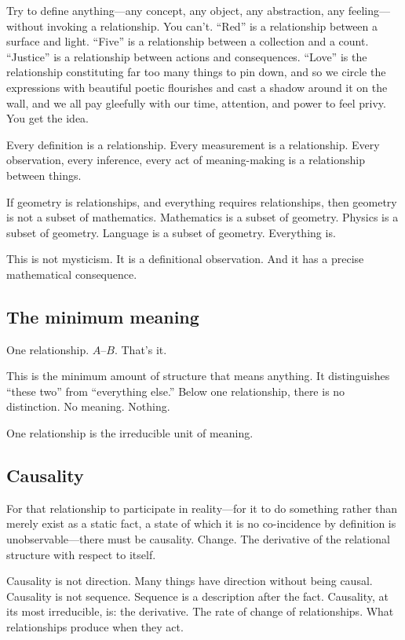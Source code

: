 \documentclass[11pt,a4paper]{article}
\theoremstyle{definition}
\theoremstyle{remark}
\begin{document}
Try to define anything---any concept, any object, any abstraction, any feeling---without invoking a relationship. You can't. ``Red'' is a relationship between a surface and light. ``Five'' is a relationship between a collection and a count. ``Justice'' is a relationship between actions and consequences. ``Love'' is the relationship constituting far too many things to pin down, and so we circle the expressions with beautiful poetic flourishes and cast a shadow around it on the wall, and we all pay gleefully with our time, attention, and power to feel privy. You get the idea.

Every definition is a relationship. Every measurement is a relationship. Every observation, every inference, every act of meaning-making is a relationship between things.

If geometry is relationships, and everything requires relationships, then geometry is not a subset of mathematics. Mathematics is a subset of geometry. Physics is a subset of geometry. Language is a subset of geometry. Everything is.

This is not mysticism. It is a definitional observation. And it has a precise mathematical consequence.

\subsection*{The minimum meaning}

One relationship. $A$--$B$. That's it.

This is the minimum amount of structure that means anything. It distinguishes ``these two'' from ``everything else.'' Below one relationship, there is no distinction. No meaning. Nothing.

One relationship is the irreducible unit of meaning.

\subsection*{Causality}

For that relationship to participate in reality---for it to do something rather than merely exist as a static fact, a state of which it is no co-incidence by definition is unobservable---there must be causality. Change. The derivative of the relational structure with respect to itself.

Causality is not direction. Many things have direction without being causal. Causality is not sequence. Sequence is a description after the fact. Causality, at its most irreducible, is: the derivative. The rate of change of relationships. What relationships produce when they act.
\end{document}
